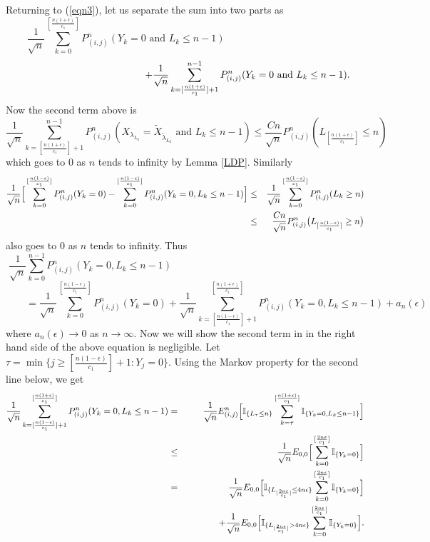 \documentclass[11pt]{amsart}
\begin{document}
 
Returning to (\ref{eqn3}), let us separate the sum into two parts as
 \[\frac{1}{\sqrt{n}}  \sum_{k=0}^{[\frac{n(1+\epsilon)}{c_1}]} P_{(i,j)}^n
 (Y_k=0   \mbox{ and } L_k \leq n-1 ) \hspace{5cm}\]
\[ \hspace{5cm} + \frac{1}{\sqrt{n}}  \sum_{k=[\frac{n(1+\epsilon)}{c_1}]+1}^{n-1} P_{(i,j)}^n
 (Y_k=0  \mbox{ and } L_k \leq n-1 ).\hspace{0.5cm}\]
Now the second term  above \; 
is
\[ \frac{1}{\sqrt{n}}  \sum_{k=[\frac {n(1+\epsilon)}{c_1}]+1}^{n-1} P_{(i,j)}^n (X_{\lambda_{L_{k}}} = \tilde{X}_{\tilde{\lambda}_{L_{k}}}   \mbox{ and } L_k \leq n-1 )  \leq  \frac{Cn}{\sqrt{n}}P_{(i,j)}^n(L_{[\frac{n(1+\epsilon)}{c_1}]} \leq n )\]
which goes to $0$ as $n$ tends to infinity by Lemma \ref{LDP}. Similarly
\begin{eqnarray*}
 \frac{1}{\sqrt{n}} \Big{[}\sum_{k=0}^{[\frac{n(1-\epsilon)}{c_1}] } P_{(i,j)}^n(Y_k=0) - \sum_{k=0}^{[\frac{n(1-\epsilon)}{c_1}]}  P_{(i,j)}^n(Y_k=0, L_k \leq n-1 ) \Big{]} 
&\leq& \frac{1}{\sqrt{n}} \sum_{k=0}^{[\frac{n(1- \epsilon)}{c_1} ]} P_{(i,j)}^n(L_k \geq n) \\
&\leq& \frac{Cn}{\sqrt{n}} P_{(i,j)}^n\big{(}L_{[\frac{n(1-\epsilon)}{c_1}]} \geq n \big{)} 
\end{eqnarray*}
also goes to $0$ as $n$ tends to infinity. Thus
\[ \frac{1}{\sqrt{n}} \sum_{k=0}^{n-1} P_{(i,j)}^n(Y_k=0, L_k \leq n-1) \hspace{8cm}\]  
\[\qquad  = \frac{1}{\sqrt{n}} \sum_{k=0}^{[\frac{n(1-\epsilon)}{c_1}]} P_{(i,j)}^n (Y_k=0) + \frac{1}{\sqrt{n}} \sum_{k=[\frac{n(1-\epsilon)}{c_1}]+1}^{[\frac{n(1+\epsilon)}{c_1}]} P_{(i,j)}^n(Y_k=0, L_k \leq n-1) +a_n(\epsilon)\]
where $a_n(\epsilon) \to 0$ as $n \to \infty$. Now we will show the second term in 
in the right hand side of the above equation is negligible.
Let $\tau = \min \lbrace j \geq [\frac{n(1-\epsilon)}{c_1}]+1 : Y_j=0 \rbrace$. Using the Markov property for the second line below, we get
\begin{eqnarray*}
 \frac{1}{\sqrt{n}} \sum_{k=[\frac{n(1-\epsilon)}{c_1}]+1}^{[\frac{n(1+\epsilon)}{c_1}]} P_{(i,j)}^n(Y_k=0, L_k \leq n-1) 
&=&\frac{1}{\sqrt{n}} E_{(i,j)}^n \Big{[} \mathbb{I}_{\lbrace L_{\tau} \leq n \rbrace} \sum_{k=\tau}^{[\frac{n(1+\epsilon)}{c_1}]} \mathbb{I}_{\lbrace Y_k=0,L_k\leq n-1 \rbrace} \Big{]} \\
&\le&  \frac{1}{\sqrt{n}} E_{0,0} \Big{[}\sum_{k=0}^{[\frac{2n\epsilon}{c_1}]} \mathbb{I}_{\lbrace Y_k=0 \rbrace} \Big{]} \\
&=& \frac{1}{\sqrt{n}}E_{0,0}\Big{[} \mathbb{I}_{\{L_{[\frac{2n\epsilon}{c_1}]} \leq 4n\epsilon \}} \sum_{k=0}^{[\frac{2n\epsilon}{c_1}]} \mathbb{I}_{\{Y_k=0\}} \Big{]}\\
 &\hspace{1cm}&+ \frac{1}{\sqrt{n}}E_{0,0} \Big{[} \mathbb{I}_{\{L_{[\frac{2n\epsilon}{c_1}]} > 4n \epsilon \}} \sum_{k=0}^{[\frac{2n\epsilon}{c_1}]} \mathbb{I}_{\{Y_k=0\}} \Big{]} .
\end{eqnarray*}
\end{document}
